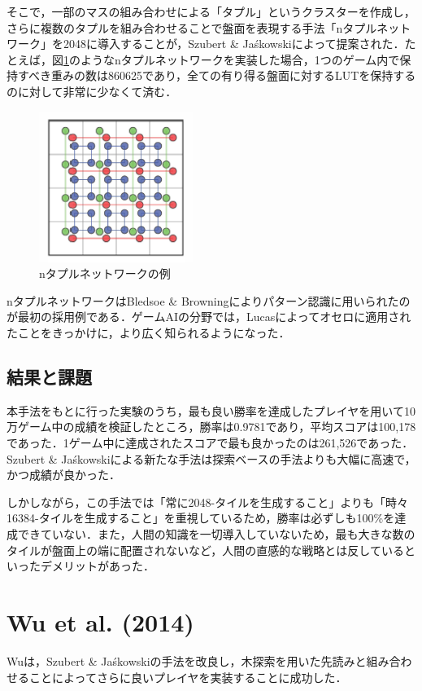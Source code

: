 \documentclass{suribt}
\begin{document}
そこで，一部のマスの組み合わせによる「タプル」というクラスターを作成し，さらに複数のタプルを組み合わせることで盤面を表現する手法「nタプルネットワーク」を2048に導入することが，Szubert \& Ja\'{s}kowskiによって提案された．たとえば，図\ref{figure_001}のようなnタプルネットワークを実装した場合，1つのゲーム内で保持すべき重みの数は860625であり，全ての有り得る盤面に対するLUTを保持するのに対して非常に少なくて済む．

\begin{figure}[t]
	\begin{center}
	\includegraphics[width=5cm]{figure_001.png}
	\caption{nタプルネットワークの例}
	\label{figure_001}
	\end{center}
\end{figure}

nタプルネットワークはBledsoe \& Browningによりパターン認識に用いられたのが最初の採用例である\cite{Bledsoe}．ゲームAIの分野では，Lucasによってオセロに適用されたことをきっかけに，より広く知られるようになった\cite{Lucas}．

\subsection{結果と課題}
本手法をもとに行った実験のうち，最も良い勝率を達成したプレイヤを用いて10万ゲーム中の成績を検証したところ，勝率は0.9781であり，平均スコアは100,178であった．1ゲーム中に達成されたスコアで最も良かったのは261,526であった．Szubert \& Ja\'{s}kowskiによる新たな手法は探索ベースの手法よりも大幅に高速で，かつ成績が良かった\cite{Szubert}．

しかしながら，この手法では「常に2048-タイルを生成すること」よりも「時々16384-タイルを生成すること」を重視しているため，勝率は必ずしも100\%を達成できていない．また，人間の知識を一切導入していないため，最も大きな数のタイルが盤面上の端に配置されないなど，人間の直感的な戦略とは反しているといったデメリットがあった．

\section{Wu et al. (2014)}
Wuは，Szubert \& Ja\'{s}kowskiの手法を改良し，木探索を用いた先読みと組み合わせることによってさらに良いプレイヤを実装することに成功した．
\end{document}
